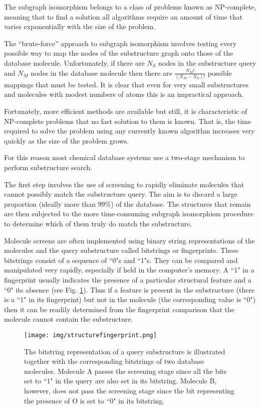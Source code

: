 \documentclass[thesis=M,english]{FITthesis}[2012/10/20]
\begin{document}
The subgraph isomorphism belongs to a class of problems known as NP-complete\cite{npcomplete}, meaning that to find a solution all algorithms require an amount of time that varies exponentially with the size of the problem. 

The ``brute-force'' approach to subgraph isomorphism involves testing every possible way to map the nodes of the substructure graph onto those of the database molecule. Unfortunately, if there are $N_S$ nodes in the substructure query and $N_M$ nodes in the database molecule then there are $\frac{N_M!}{(N_M-N_S)!}$ possible mappings that must be tested.\cite{intro} It is clear that even for very small substructures and molecules with modest numbers of atoms this is an impractical approach. 

Fortunately, more efficient methods are available but still, it is characteristic of NP-complete problems that no fast solution to them is known. That is, the time required to solve the problem using any currently known algorithm increases very quickly as the size of the problem grows.

For this reason most chemical database systems use a two-stage mechanism to perform substructure search. 

The first step involves the use of screening to rapidly eliminate molecules that cannot possibly match the substructure query. The aim is to discard a large proportion (ideally more than 99\%) of the database. The structures that remain are then subjected to the more time-consuming subgraph isomorphism procedure to determine which of them truly do match the substructure. 

Molecule screens are often implemented using binary string representations of the molecules and the query substructure called bitstrings or fingerprints. These bitstrings consist of a sequence of ``0"s and ``1"s. They can be compared and manipulated very rapidly, especially if held in the computer’s memory. A ``1" in a fingerprint usually indicates the presence of a particular structural feature and a ``0" its absence (see Fig. \ref{fig:structureFingerprint}). Thus if a feature is present in the substructure (there is a ``1" in its fingerprint) but not in the molecule (the corresponding value is ``0") then it can be readily determined from the fingerprint comparison that the molecule cannot contain the substructure.\cite{intro}

\begin{figure}
  \centering
  \texttt{[image: img/structurefingerprint.png]}
  \caption{The bitstring representation of a query substructure is illustrated together with the
corresponding bitstrings of two database molecules. Molecule A passes the screening stage since
all the bits set to ``1" in the query are also set in its bitstring. Molecule B, however, does not pass
the screening stage since the bit representing the presence of O is set to ``0" in its bitstring.}
  \label{fig:structureFingerprint}
\end{figure}
\end{document}
